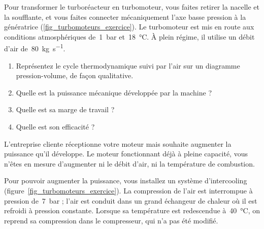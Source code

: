 	Pour transformer le turboréacteur en turbomoteur, vous faites retirer la nacelle et la soufflante, et vous faites connecter mécaniquement l’axe basse pression à la génératrice (\cref{fig_turbomoteurs_exercice}). Le turbomoteur est mis en route aux conditions atmosphériques de~\SI{1}{\bar} et~\SI{18}{\degreeCelsius}. À plein régime, il utilise un débit d’air de~\SI{80}{\kilogram\per\second}.
	
	\begin{enumerate}
		\item Représentez le cycle thermodynamique suivi par l’air sur un diagramme pression-volume, de façon qualitative.
		\item Quelle est la puissance mécanique développée par la machine ?
		\item Quelle est sa marge de travail ?
		\item Quelle est son efficacité ?
	\end{enumerate}
	
	L’entreprise cliente réceptionne votre moteur mais souhaite augmenter la puissance qu’il développe. Le moteur fonctionnant déjà à pleine capacité, vous n’êtes en mesure d’augmenter ni le débit d’air, ni la température de combustion.
	
	Pour pouvoir augmenter la puissance, vous installez un système d’intercooling (figure~\ref{fig_turbomoteurs_exercice}). La compression de l’air est interrompue à pression de~\SI{7}{\bar} ; l’air est conduit dans un grand échangeur de chaleur où il est refroidi à pression constante. Lorsque sa température est redescendue à~\SI{40}{\celsius}, on reprend sa compression dans le compresseur, qui n’a pas été modifié.
	
